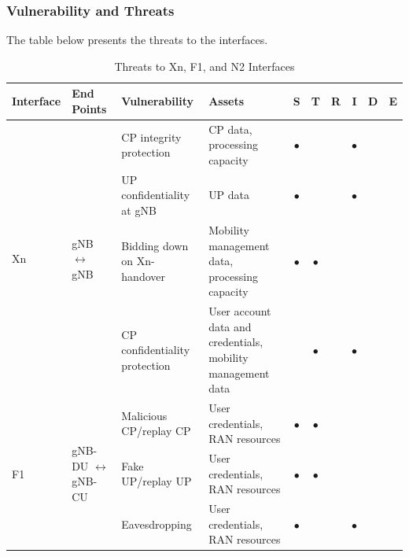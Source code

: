 \documentclass{report}
\begin{document}
\subsubsection{Vulnerability and Threats}
The table below presents the threats to the interfaces.


\begin{table}[H]
    \centering
    \caption{Threats to Xn, F1, and N2 Interfaces \cite{mahyoub2024security}}
    \renewcommand{\arraystretch}{1.2} 
    \setlength{\tabcolsep}{5pt} 
    \begin{tabularx}{\textwidth}{|l|l|X|X|c|c|c|c|c|c|}
    \hline
    \textbf{Interface} & \textbf{End Points} & \textbf{Vulnerability} & \textbf{Assets} & \textbf{S} & \textbf{T} & \textbf{R} & \textbf{I} & \textbf{D} & \textbf{E} \\ 
    \hline
    \multirow{4}{*}{Xn} 
        & \multirow{4}{*}{gNB $\leftrightarrow$ gNB} 
        & CP integrity protection & CP data, processing capacity & $\bullet$ &  &  & $\bullet$ &  &  \\ \cline{3-10}
        & & UP confidentiality at gNB & UP data & $\bullet$ &  &  & $\bullet$ &  &  \\ \cline{3-10}
        & & Bidding down on Xn-handover & Mobility management data, processing capacity & $\bullet$ & $\bullet$ &  &  &  &  \\ \cline{3-10}
        & & CP confidentiality protection & User account data and credentials, mobility management data &  & $\bullet$ &  & $\bullet$ &  &  \\ \hline
    
    \multirow{3}{*}{F1} 
        & \multirow{3}{*}{gNB-DU $\leftrightarrow$ gNB-CU} 
        & Malicious CP/replay CP & User credentials, RAN resources & $\bullet$ & $\bullet$ &  &  &  &  \\ \cline{3-10}
        & & Fake UP/replay UP & User credentials, RAN resources & $\bullet$ & $\bullet$ &  &  &  &  \\ \cline{3-10}
        & & Eavesdropping & User credentials, RAN resources & $\bullet$ &  &  & $\bullet$ &  &  \\ \hline
    

\end{tabularx}
\end{table}
\end{document}
